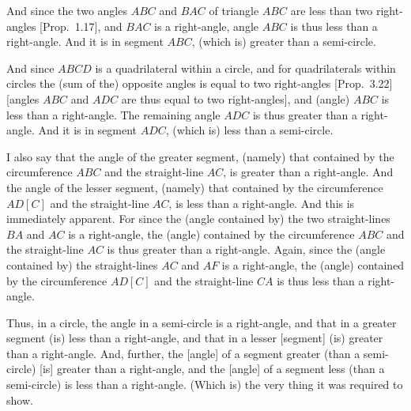 \begin{Parallel}{}{}
{And since the two angles $ABC$ and $BAC$ of triangle $ABC$ are less than 
two right-angles [Prop.~1.17], and $BAC$ is a right-angle, angle $ABC$ is
thus less than a right-angle. And it is in segment $ABC$, (which is) greater 
than
a semi-circle.

And since $ABCD$ is a quadrilateral within a circle, and for quadrilaterals within circles
the (sum of the) opposite angles is equal to two right-angles 
[Prop.~3.22] [angles $ABC$ and $ADC$ are thus equal to two right-angles],
and (angle) $ABC$ is  less than a right-angle. The remaining angle $ADC$
is thus greater than a right-angle. And it is in segment $ADC$, (which is)
less than a semi-circle.

I also say that the angle of the greater segment, (namely) that contained by
the circumference $ABC$ and the straight-line $AC$, is greater than a right-angle.
And the angle of the lesser segment, (namely) that contained by the circumference
$AD[C]$ and the straight-line $AC$, is less than a right-angle. And
this is immediately apparent. For since the (angle contained by) the
two straight-lines $BA$ and $AC$ is a right-angle, the (angle) contained
by the circumference $ABC$ and the straight-line $AC$ is thus greater than a right-angle. Again, since the (angle contained by) the straight-lines
$AC$ and $AF$ is a right-angle, the (angle) contained by the circumference
$AD[C]$ and the straight-line $CA$ is thus less than a right-angle.

Thus, in a circle, the angle in a semi-circle is a right-angle, and that in a
greater segment (is) less than a right-angle, and that in a
lesser [segment] (is) greater than a right-angle. And, further, the [angle] of
a segment greater (than a semi-circle) [is] greater than a right-angle, and
the [angle] of a segment less (than a semi-circle) is  less than a right-angle.
(Which is) the very thing it was required to show.}
\end{Parallel}

